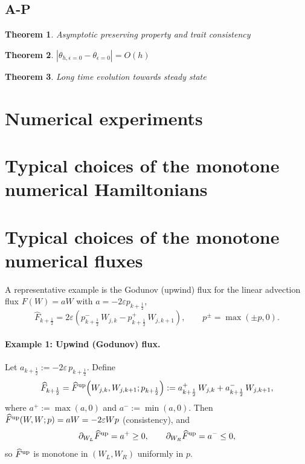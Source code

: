 \documentclass[11pt, dina4, amsfont12]{article}
\newtheorem{theorem}{Theorem}[section]
\begin{document}
\subsection{A-P}

\begin{theorem}
    Asymptotic preserving property and trait consistency
\end{theorem}

\begin{theorem}
    $|\theta_{h,\epsilon=0}-\theta_{\epsilon=0}| = O(h)$ 
\end{theorem}

\begin{theorem}
    Long time evolution towards steady state
\end{theorem}


\section{Numerical experiments}

\appendix
\section{Typical choices of the monotone numerical Hamiltonians} \label{append:HJ}

\section{Typical choices of the monotone numerical fluxes} \label{append:flux}
A representative example is the Godunov (upwind) flux for the linear advection
flux $F(W)=aW$ with $a=-2\varepsilon p_{k+\frac12}$,
\[
\widehat F_{k+\frac12}
=
2\varepsilon\!\left(
p_{k+\frac12}^-\, W_{j,k}
-
p_{k+\frac12}^+\, W_{j,k+1}
\right),
\qquad
p^\pm=\max(\pm p,0).
\]

\paragraph{Example 1: Upwind (Godunov) flux.}
Let $a_{k+\frac12}:=-2\varepsilon\,p_{k+\frac12}$. Define
\begin{equation}\label{eq:flux_upwind}
\widehat F_{k+\frac12}
=\widehat F^{\rm up}\!\left(W_{j,k},W_{j,k+1};p_{k+\frac12}\right)
:=a_{k+\frac12}^+\,W_{j,k}+a_{k+\frac12}^-\,W_{j,k+1},
\end{equation}
where $a^+:=\max(a,0)$ and $a^-:=\min(a,0)$.
Then $\widehat F^{\rm up}(W,W;p)=aW=-2\varepsilon W p$ (consistency), and
\[
\partial_{W_L}\widehat F^{\rm up}=a^+\ge0,\qquad
\partial_{W_R}\widehat F^{\rm up}=a^-\le0,
\]
so $\widehat F^{\rm up}$ is monotone in $(W_L,W_R)$ uniformly in $p$.
\end{document}
